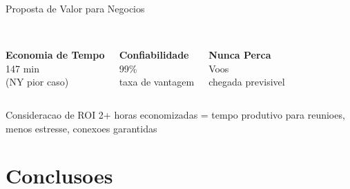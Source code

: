\documentclass[aspectratio=169,9pt]{beamer}
\begin{document}
\begin{frame}{Proposta de Valor para Negocios}
\begin{columns}
\begin{center}
\textcolor{revoBlue}{\Large{\faClock}}\\[0.3em]
\small{\textbf{Economia de Tempo}}\\[0.3em]
\large{147 min}\\
\footnotesize{(NY pior caso)}
\end{center}

\begin{center}
\textcolor{revoGreen}{\Large{\faCheckCircle}}\\[0.3em]
\small{\textbf{Confiabilidade}}\\[0.3em]
\large{99\%}\\
\footnotesize{taxa de vantagem}
\end{center}

\begin{center}
\textcolor{revoOrange}{\Large{\faPlane}}\\[0.3em]
\small{\textbf{Nunca Perca}}\\[0.3em]
\large{Voos}\\
\footnotesize{chegada previsivel}
\end{center}
\end{columns}

\vspace{0.8em}
\begin{exampleblock}{Consideracao de ROI}
\small{2+ horas economizadas = tempo produtivo para reunioes, menos estresse, conexoes garantidas}
\end{exampleblock}
\end{frame}

\section{Conclusoes}
\end{document}
